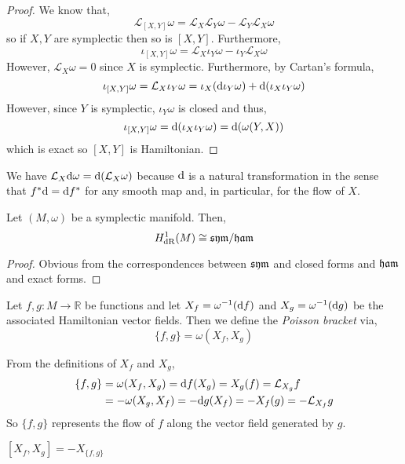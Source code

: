 \documentclass[12pt]{extarticle}
\renewcommand{\L}{\mathcal{L}}
\newcommand{\R}{\mathbb{R}}
\newcommand{\dR}{\mathrm{dR}}
\begin{document}
\begin{proof}
We know that,
\[ \L_{[X,Y]} \omega = \L_X \L_Y \omega - \L_Y \L_X \omega \]
so if $X,Y$ are symplectic then so is $[X, Y]$. Furthermore, 
\[ \iota_{[X, Y]} \omega = \L_X \iota_Y \omega - \iota_Y \L_X \omega \]
However, $\L_X \omega = 0$ since $X$ is symplectic. Furthermore, by Cartan's formula,
\[ \iota_{[X, Y]} \omega = \L_X \iota_Y \omega = \iota_X (\d \iota_Y \omega) + \d( \iota_X \iota_Y \omega) \]
However, since $Y$ is symplectic, $\iota_Y \omega$ is closed and thus,
\[ \iota_{[X, Y]} \omega = \mathrm{d} (\iota_X \iota_Y \omega) = \mathrm{d}{(\omega(Y, X))} \]
which is exact so $[X, Y]$ is Hamiltonian. 
\end{proof}

\begin{remark}
We have $\L_X \d{\omega} = \d{(\L_X \omega)}$ because $\mathrm{d}$ is a natural transformation in the sense that $f^* \mathrm{d} = \mathrm{d} f^*$ for any smooth map and, in particular, for the flow of $X$. 
\end{remark}

\begin{prop}
Let $(M, \omega)$ be a symplectic manifold. Then,
\[ H^1_{\dR}(M) \cong \sym / \ham \]
\end{prop}

\begin{proof}
Obvious from the correspondences between $\mathfrak{sym}$ and closed forms and $\mathfrak{ham}$ and exact forms.
\end{proof}

\begin{definition}
Let $f, g : M \to \R$ be functions and let $X_f = \omega^{-1}(\mathrm{d}{f})$ and $X_g = \omega^{-1}(\mathrm{d}{g})$ be the associated Hamiltonian vector fields. Then we define the \textit{Poisson bracket} via,
\[ \{ f, g \} = \omega(X_f, X_g) \] 
\end{definition}

\begin{remark}
From the definitions of $X_f$ and $X_g$,
\begin{align*}
\{ f, g \} & = \omega(X_f, X_g) = \d{f}(X_g) = X_g(f) = \L_{X_g} f
\\
& = - \omega(X_g, X_f) = -\d{g}(X_f) = - X_f(g) = - \L_{X_f} g
\end{align*}
So $\{ f, g \}$ represents the flow of $f$ along the vector field generated by $g$. 
\end{remark}

\begin{lemma}
$[X_f, X_g] = - X_{\{ f, g \}}$ 
\end{lemma}
\end{document}
